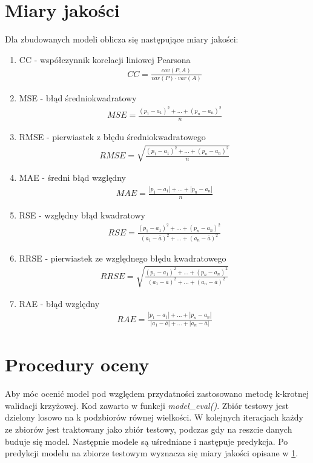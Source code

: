 \documentclass[a4paper,11pt,twoside]{mwrep}  %
\begin{document}
\vspace*{\fill}
\pagebreak

\section{Miary jakości}\label{sect:ocenamodeli}
Dla zbudowanych modeli oblicza się następujące miary jakości:
\begin{enumerate}
\item
CC - współczynnik korelacji liniowej Pearsona\\
\begin{gather*}
	CC =\frac{cov(P,A)}{var(P) \cdot var(A)}
\end{gather*}
\item
MSE - błąd średniokwadratowy
\begin{gather*}
	MSE = \frac{(p_1-a_1)^2+...+(p_n-a_n)^2}{n}
\end{gather*}
\item
RMSE - pierwiastek z błędu średniokwadratowego
\begin{gather*}
	RMSE = \sqrt{\frac{(p_1-a_1)^2+...+(p_n-a_n)^2}{n}}
\end{gather*}
\item
MAE - średni błąd względny
\begin{gather*}
	MAE = \frac{|p_1-a_1|+...+|p_n-a_n|}{n}
\end{gather*}
\item
RSE - względny błąd kwadratowy
\begin{gather*}
	RSE = \frac{(p_1-a_1)^2+...+(p_n-a_n)^2}{(a_1-\overline{a})^2+...+(a_n-\overline{a})^2}
\end{gather*}
\item
RRSE - pierwiastek ze względnego błędu kwadratowego
\begin{gather*}
	RRSE = \sqrt{\frac{(p_1-a_1)^2+...+(p_n-a_n)^2}{(a_1-\overline{a})^2+...+(a_n-\overline{a})^2}}
\end{gather*}
\item
RAE - błąd względny
\begin{gather*}
	RAE = \frac{|p_1-a_1|+...+|p_n-a_n|}{|a_1-\overline{a}|+...+|a_n-\overline{a}|}
\end{gather*}
\end{enumerate}

\section{Procedury oceny}\label{sect:proceduryOceny}
Aby móc ocenić model pod względem przydatności zastosowano metodę k-krotnej walidacji krzyżowej. Kod zawarto w funkcji \textit{model\_eval()}.
Zbiór testowy jest dzielony losowo na k podzbiorów równej wielkości. W kolejnych iteracjach każdy ze zbiorów jest traktowany jako zbiór testowy, podczas gdy na reszcie danych buduje się model. Następnie modele są uśredniane i następuje predykcja. Po predykcji modelu na zbiorze testowym wyznacza się miary jakości opisane w \ref{sect:ocenamodeli}.      
\end{document}
